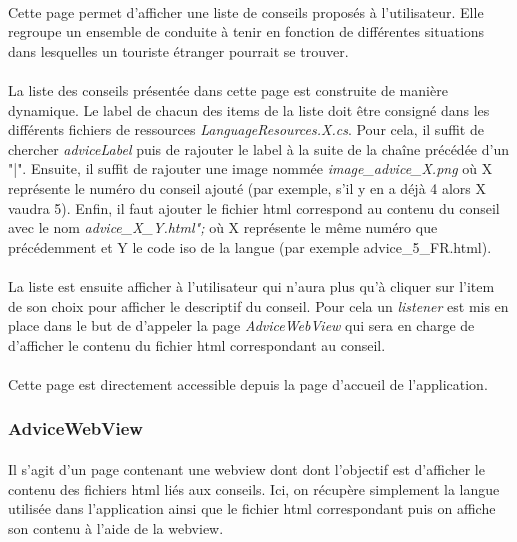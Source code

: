 	\paragraph{}
		Cette page permet d'afficher une liste de conseils proposés à l'utilisateur. Elle regroupe un ensemble de conduite à tenir en fonction de différentes situations dans lesquelles un touriste étranger pourrait se trouver.
		
	\paragraph{}		
		La liste des conseils présentée dans cette page est construite de manière dynamique. Le label de chacun des items de la liste doit être consigné dans les différents fichiers de ressources \emph{LanguageResources.X.cs}. Pour cela, il suffit de chercher \emph{adviceLabel} puis de rajouter le label à la suite de la chaîne précédée d'un "|". Ensuite, il suffit de rajouter une image nommée \emph{image\_advice\_X.png} où X représente le numéro du conseil ajouté (par exemple, s'il y en a déjà 4 alors X vaudra 5). Enfin, il faut ajouter le fichier html correspond au contenu du conseil avec le nom \emph{advice\_X\_Y.html";} où X représente le même numéro que précédemment et Y le code iso de la langue (par exemple advice\_5\_FR.html).
	

	\paragraph{}
		La liste est ensuite afficher à l'utilisateur qui n'aura plus qu'à cliquer sur l'item de son choix pour afficher le descriptif du conseil. Pour cela un \emph{listener} est mis en place dans le but de d'appeler la page \emph{AdviceWebView} qui sera en charge de d'afficher le contenu du fichier html correspondant au conseil.

	\paragraph{}
		Cette page est directement accessible depuis la page d'accueil de l'application.
		
	\subsubsection{AdviceWebView}
		\paragraph{}
			Il s'agit d'un page contenant une webview dont dont l'objectif est d'afficher le contenu des fichiers html liés aux conseils. Ici, on récupère simplement la langue utilisée dans l'application ainsi que le fichier html correspondant puis on affiche son contenu à l'aide de la webview.
		
